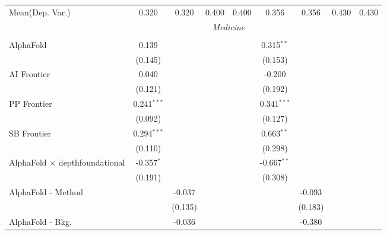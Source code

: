 \begin{tabular}{lcccccccc}
Mean(Dep. Var.) & 0.320 & 0.320 & 0.400 & 0.400 & 0.356 & 0.356 & 0.430 & 0.430 \\
 & \multicolumn{6}{c}{\textit{Medicine}} \\ \\
   AlphaFold                                      & 0.139         &               &        &        & 0.315$^{**}$  &               &       &   \\   
                                                  & (0.145)       &               &        &        & (0.153)       &               &       &   \\   
   AI Frontier                                    & 0.040         &               &        &        & -0.200        &               &       &   \\   
                                                  & (0.121)       &               &        &        & (0.192)       &               &       &   \\   
   PP Frontier                                    & 0.241$^{***}$ &               &        &        & 0.341$^{***}$ &               &       &   \\   
                                                  & (0.092)       &               &        &        & (0.127)       &               &       &   \\   
   SB Frontier                                    & 0.294$^{***}$ &               &        &        & 0.663$^{**}$  &               &       &   \\   
                                                  & (0.110)       &               &        &        & (0.298)       &               &       &   \\   
   AlphaFold $\times$ depthfoundational           & -0.357$^{*}$  &               &        &        & -0.667$^{**}$ &               &       &   \\   
                                                  & (0.191)       &               &        &        & (0.308)       &               &       &   \\   
   AlphaFold - Method                             &               & -0.037        &        &        &               & -0.093        &       &   \\   
                                                  &               & (0.135)       &        &        &               & (0.183)       &       &   \\   
   AlphaFold - Bkg.                               &               & -0.036        &        &        &               & -0.380        &       &   \\   

\end{tabular}
